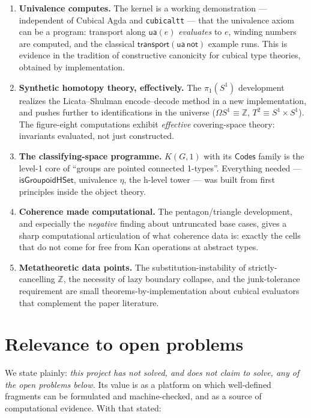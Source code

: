 \documentclass[11pt]{article}
\newcommand{\Z}{\mathbb{Z}}
\newcommand{\op}[1]{\ensuremath{\mathsf{#1}}}
\begin{document}
\begin{enumerate}[leftmargin=1.7em]
\item \textbf{Univalence computes.}  The kernel is a working
demonstration --- independent of Cubical Agda and \texttt{cubicaltt} ---
that the univalence axiom can be a program: transport along
$\op{ua}(e)$ \emph{evaluates} to $e$, winding numbers are computed, and
the classical $\op{transport}(\op{ua}\,\op{not})$ example runs.  This is
evidence in the tradition of constructive canonicity for cubical type
theories, obtained by implementation.
\item \textbf{Synthetic homotopy theory, effectively.}  The
$\pi_1(S^1)$ development realizes the Licata--Shulman encode--decode
method in a new implementation, and pushes further to identifications in
the universe ($\Omega S^1\equiv\Z$, $T^2\equiv S^1{\times}S^1$).  The
figure-eight computations exhibit \emph{effective} covering-space theory:
invariants evaluated, not just constructed.
\item \textbf{The classifying-space programme.}  $K(G,1)$ with its
$\op{Codes}$ family is the level-1 core of ``groups are pointed connected
1-types''.  Everything needed --- $\op{isGroupoidHSet}$, univalence
$\eta$, the h-level tower --- was built from first principles inside the
object theory.
\item \textbf{Coherence made computational.}  The pentagon/triangle
development, and especially the \emph{negative} finding about untruncated
base cases, gives a sharp computational articulation of what coherence
data is: exactly the cells that do not come for free from Kan operations
at abstract types.
\item \textbf{Metatheoretic data points.}  The substitution-instability
of strictly-cancelling $\Z$, the necessity of lazy boundary collapse,
and the junk-tolerance requirement are small theorems-by-implementation
about cubical evaluators that complement the paper literature.
\end{enumerate}

\section{Relevance to open problems}\label{sec:open}

We state plainly: \emph{this project has not solved, and does not claim
to solve, any of the open problems below.}  Its value is as a platform on
which well-defined fragments can be formulated and machine-checked, and
as a source of computational evidence.  With that stated:
\end{document}

